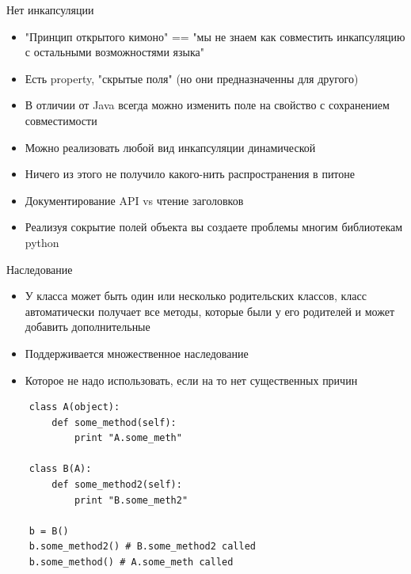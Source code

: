 \documentclass{article}
\begin{document}
\begin{center} Нет инкапсуляции \end{center}
\begin{itemize}
    \item "Принцип открытого кимоно" == 
        "мы не знаем как совместить инкапсуляцию 
        с остальными возможностями языка"
    \item Есть property, "скрытые поля" (но они предназначенны для другого)
    \item В отличии от Java всегда можно изменить поле на свойство 
            с сохранением совместимости
    \item Можно реализовать любой вид инкапсуляции динамической
    \item Ничего из этого не получило какого-нить распространения в питоне
    \item Документирование API vs чтение заголовков
    \item Реализуя сокрытие полей объекта вы 
        создаете проблемы многим библиотекам python
\end{itemize}
\newpage

\begin{center} Наследование \end{center}
\begin{itemize}
    \item У класса может быть один или несколько родительских классов, 
          класс автоматически получает все методы, которые были у его родителей
          и может добавить дополнительные
    \item Поддерживается множественное наследование
    \item Которое не надо использовать, если на то нет существенных причин
\end{itemize}

{
\Large
\vspace{15pt}
\begin{lstlisting}
    class A(object):
        def some_method(self):
            print "A.some_meth"

    class B(A):
        def some_method2(self):
            print "B.some_meth2"

    b = B() 
    b.some_method2() # B.some_method2 called
    b.some_method() # A.some_meth called
\end{lstlisting}
}
\newpage
\end{document}
